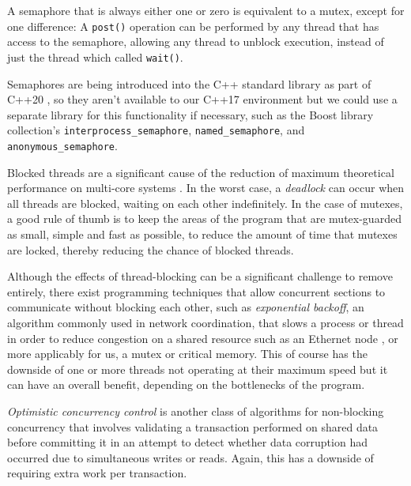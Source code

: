\documentclass[11pt, a4paper, twocolumn]{article}
\begin{document}
A semaphore that is always either one or zero is equivalent to a mutex, except for one difference: A \verb|post()| operation can be performed by any thread that has access to the semaphore, allowing any thread to unblock execution, instead of just the thread which called \verb|wait()|.

Semaphores are being introduced into the C++ standard library as part of C++20 \citep{C20Sync}, so they aren't available to our C++17 environment but we could use a separate library for this functionality if necessary, such as the Boost library collection's \verb|interprocess_semaphore|, \verb|named_semaphore|, and \verb|anonymous_semaphore|.

Blocked threads are a significant cause of the reduction of maximum theoretical performance on multi-core systems \citep{Alemany1992}. In the worst case, a \emph{deadlock} can occur when all threads are blocked, waiting on each other indefinitely. In the case of mutexes, a good rule of thumb is to keep the areas of the program that are mutex-guarded as small, simple and fast as possible, to reduce the amount of time that mutexes are locked, thereby reducing the chance of blocked threads.

Although the effects of thread-blocking can be a significant challenge to remove entirely, there exist programming techniques that allow concurrent sections to communicate without blocking each other, such as \emph{exponential backoff}, an algorithm commonly used in network coordination, that slows a process or thread in order to reduce congestion on a shared resource such as an Ethernet node \citep{Goodman2019}, or more applicably for us, a mutex or critical memory. This of course has the downside of one or more threads not operating at their maximum speed but it can have an overall benefit, depending on the bottlenecks of the program.

\emph{Optimistic concurrency control} is another class of algorithms for non-blocking concurrency that involves validating a transaction performed on shared data before committing it \citep{Herlihy1993} in an attempt to detect whether data corruption had occurred due to simultaneous writes or reads. Again, this has a downside of requiring extra work per transaction.

\end{document}
